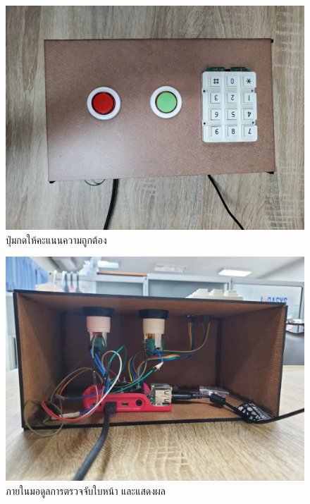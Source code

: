 
\begin{figure}[!ht]
  \begin{center}
    \includegraphics[scale=.17]{pic/rpi_top.jpg}
    \caption[ปุ่มกดให้คะแนนความถูกต้อง]{ปุ่มกดให้คะแนนความถูกต้อง}
    \label{fig:button_module}
  \end{center}
\end{figure}

\begin{figure}[!ht]
  \begin{center}
    \includegraphics[scale=.17]{pic/rpi_back.jpg}
    \caption[ภายในมอดูลการตรวจจับใบหน้า และแสดงผล]{ภายในมอดูลการตรวจจับใบหน้า และแสดงผล}
    \label{fig:inside_module}
  \end{center}
\end{figure}

